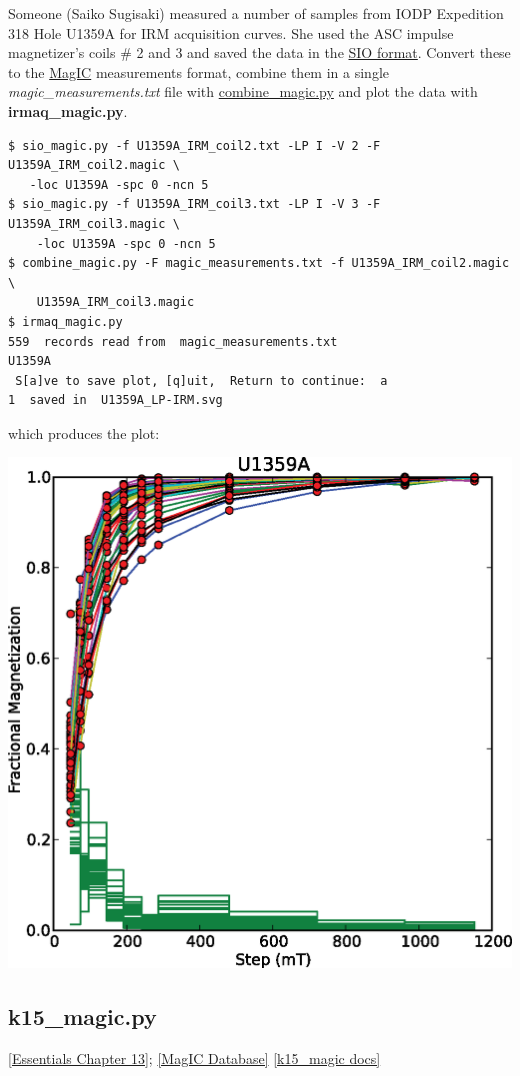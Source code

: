 \documentclass[11pt]{book}
\begin{document}
{{Someone (Saiko Sugisaki) measured a number of samples from IODP Expedition 318 Hole U1359A for IRM acquisition curves.  She used the ASC impulse magnetizer's coils \# 2 and 3 and saved the data in the \href{#sio_magic.py}{SIO format}.   Convert these to the \href{#MagIC}{MagIC} measurements  format, combine them in a  single {\it magic\_measurements.txt} file with \href{#combine_magic.py}{combine\_magic.py} and plot the data with {\bf irmaq\_magic.py}.

\begin{verbatim}
$ sio_magic.py -f U1359A_IRM_coil2.txt -LP I -V 2 -F U1359A_IRM_coil2.magic \
   -loc U1359A -spc 0 -ncn 5
$ sio_magic.py -f U1359A_IRM_coil3.txt -LP I -V 3 -F U1359A_IRM_coil3.magic \
    -loc U1359A -spc 0 -ncn 5
$ combine_magic.py -F magic_measurements.txt -f U1359A_IRM_coil2.magic \
    U1359A_IRM_coil3.magic
$ irmaq_magic.py
559  records read from  magic_measurements.txt
U1359A
 S[a]ve to save plot, [q]uit,  Return to continue:  a
1  saved in  U1359A_LP-IRM.svg
\end{verbatim}

which produces the plot:

\includegraphics[width=15cm]{EPSfiles/irmaq_magic.eps}

%
\subsection{k15\_magic.py}
\href{http://earthref.org/MAGIC/books/Tauxe/Essentials/WebBook3ch13.html#ch13}{[Essentials Chapter 13]};
\href{#MagICDatabase}{[MagIC Database]}
\href{https://github.com/PmagPy/PmagPy/blob/master/programs/k15_magic.py}{[k15\_magic docs]}


}}
\end{document}
